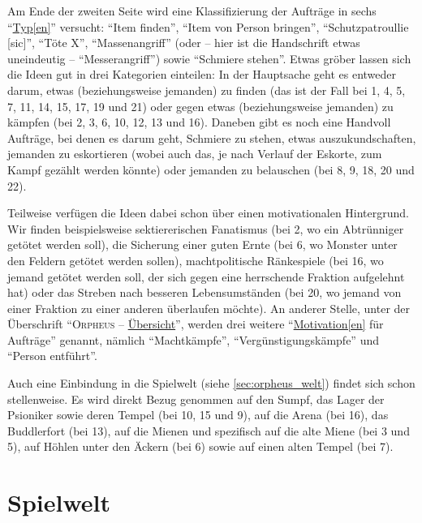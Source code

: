 \documentclass[a5paper,pagesize,numbers=noenddot]{scrbook}
\begin{document}
Am Ende der zweiten Seite wird eine Klassifizierung der Aufträge in sechs \enquote{\uline{Typ[en]}} versucht:
\enquote{Item finden}, \enquote{Item von Person bringen}, \enquote{Schutzpatroullie [sic]}, \enquote{Töte X}, \enquote{Massenangriff} (oder -- hier ist die Handschrift etwas uneindeutig -- \enquote{Messerangriff}) sowie \enquote{Schmiere stehen}.\autocite[S.~17]{orpheus_b_scribbles}
Etwas gröber lassen sich die Ideen gut in drei Kategorien einteilen:
In der Hauptsache geht es entweder darum, etwas (beziehungsweise jemanden) zu finden (das ist der Fall bei 1, 4, 5, 7, 11, 14, 15, 17, 19 und 21) oder gegen etwas (beziehungsweise jemanden) zu kämpfen (bei 2, 3, 6, 10, 12, 13 und 16).
Daneben gibt es noch eine Handvoll Aufträge, bei denen es darum geht, Schmiere zu stehen, etwas auszukundschaften, jemanden zu eskortieren (wobei auch das, je nach Verlauf der Eskorte, zum Kampf gezählt werden könnte) oder jemanden zu belauschen (bei 8, 9, 18, 20 und 22).

Teilweise verfügen die Ideen dabei schon über einen motivationalen Hintergrund.
Wir finden beispielsweise sektiererischen Fanatismus (bei 2, wo ein Abtrünniger getötet werden soll), die Sicherung einer guten Ernte (bei 6, wo Monster unter den Feldern getötet werden sollen), machtpolitische Ränkespiele (bei 16, wo jemand getötet werden soll, der sich gegen eine herrschende Fraktion aufgelehnt hat) oder das Streben nach besseren Lebensumständen (bei 20, wo jemand von einer Fraktion zu einer anderen überlaufen möchte).
An anderer Stelle, unter der Überschrift \enquote{\textsc{Orpheus} -- \uline{Übersicht}}, werden drei weitere \enquote{\uline{Motivation[en]} für Aufträge} genannt, nämlich \enquote{Machtkämpfe}, \enquote{Vergünstigungskämpfe} und \enquote{Person entführt}.\autocite[S.~12]{orpheus_b_scribbles}

Auch eine Einbindung in die Spielwelt (siehe \autoref{sec:orpheus_welt}) findet sich schon stellenweise.
Es wird direkt Bezug genommen auf den Sumpf, das Lager der Psioniker sowie deren Tempel (bei 10, 15 und 9), auf die Arena (bei 16), das Buddlerfort (bei 13), auf die Mienen und spezifisch auf die alte Miene (bei 3 und 5), auf Höhlen unter den Äckern (bei 6) sowie auf einen alten Tempel (bei 7).


\section{Spielwelt}\label{sec:orpheus_welt}
\end{document}
